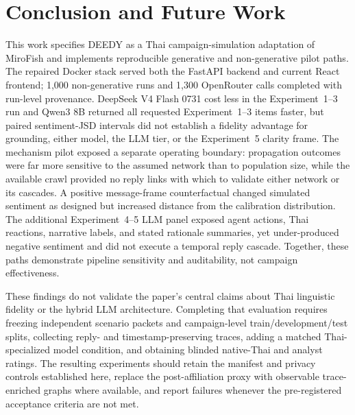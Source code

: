 \documentclass[conference]{IEEEtran}
\begin{document}
\section{Conclusion and Future Work}

This work specifies DEEDY as a Thai campaign-simulation adaptation of MiroFish
and implements reproducible generative and non-generative pilot paths. The
repaired Docker stack served both the FastAPI backend and current React
frontend; 1,000 non-generative runs and 1,300 OpenRouter calls completed with
run-level provenance. DeepSeek V4 Flash 0731 cost less in the Experiment~1--3
run and Qwen3 8B returned all requested Experiment~1--3 items faster, but paired
sentiment-JSD intervals did not establish a fidelity advantage for grounding,
either model, the LLM tier, or the Experiment~5 clarity frame.
The mechanism pilot exposed a separate operating boundary: propagation outcomes
were far more sensitive to the assumed network than to population size, while
the available crawl provided no reply links with which to validate either
network or its cascades. A positive message-frame counterfactual changed
simulated sentiment as designed but increased distance from the calibration
distribution. The additional Experiment~4--5 LLM panel exposed agent actions,
Thai reactions, narrative labels, and stated rationale summaries, yet
under-produced negative sentiment and did not execute a temporal reply cascade.
Together, these paths demonstrate pipeline sensitivity and auditability, not
campaign effectiveness.

These findings do not validate the paper's central claims about Thai linguistic
fidelity or the hybrid LLM architecture. Completing that evaluation requires
freezing independent scenario packets and campaign-level train/development/test
splits, collecting reply- and timestamp-preserving traces, adding a matched
Thai-specialized model condition, and obtaining blinded native-Thai and analyst
ratings. The resulting experiments should retain the manifest and privacy
controls established here, replace the post-affiliation proxy with observable
trace-enriched graphs where available, and report failures whenever the
pre-registered acceptance criteria are not met.



\end{document}
